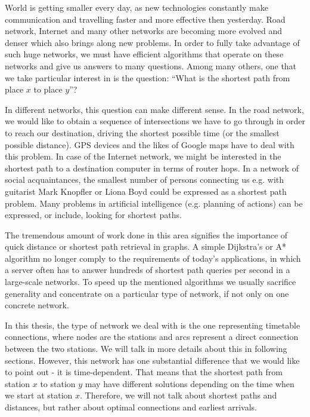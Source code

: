 \noindent World is getting smaller every day, as new technologies constantly make communication and travelling faster and more effective then yesterday. Road network, Internet and many other networks are becoming more evolved and denser which also brings along new problems. In order to fully take advantage of such huge networks, we must have efficient algorithms that operate on these networks and give us answers to many questions. Among many others, one that we take particular interest in is the question: ``What is the shortest path from place $x$ to place $y$''?

In different networks, this question can make different sense. In the road network, we would like to obtain a sequence of intersections we have to go through in order to reach our destination, driving the shortest possible time (or the smallest possible distance). GPS devices and the likes of Google maps have to deal with this problem. In case of the Internet network, we might be interested in the shortest path to a destination computer in terms of router hops. In a network of social acquaintances, the smallest number of persons connecting us e.g. with guitarist Mark Knopfler or Liona Boyd could be expressed as a shortest path problem. Many problems in artificial intelligence (e.g. planning of actions) can be expressed, or include, looking for shortest paths.

The tremendous amount of work done in this area signifies the importance of quick distance or shortest path retrieval in graphs. A simple Dijkstra's or A* algorithm no longer comply to the requirements of today's applications, in which a server often has to answer hundreds of shortest path queries per second in a large-scale networks. To speed up the mentioned algorithms we usually sacrifice generality and concentrate on a particular type of network, if not only on one concrete network.

In this thesis, the type of network we deal with is the one representing timetable connections, where nodes are the stations and arcs represent a direct connection between the two stations. We will talk in more details about this in following sections. However, this network has one substantial difference that we would like to point out - it is time-dependent. That means that the shortest path from station $x$ to station $y$ may have different solutions depending on the time when we start at station $x$. Therefore, we will not talk about shortest paths and distances, but rather about optimal connections and earliest arrivals. 


